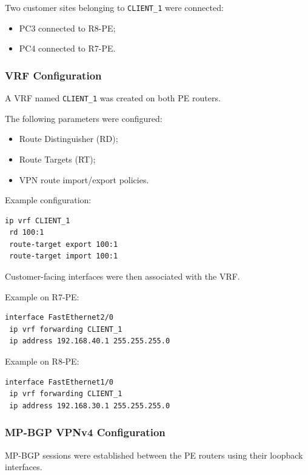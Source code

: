 \documentclass[12pt]{article}
\begin{document}
Two customer sites belonging to \texttt{CLIENT\_1} were connected:
\begin{itemize}
    \item PC3 connected to R8-PE;
    \item PC4 connected to R7-PE.
\end{itemize}

\subsubsection{VRF Configuration}

A VRF named \texttt{CLIENT\_1} was created on both PE routers.

The following parameters were configured:
\begin{itemize}
    \item Route Distinguisher (RD);
    \item Route Targets (RT);
    \item VPN route import/export policies.
\end{itemize}

Example configuration:

\begin{lstlisting}
ip vrf CLIENT_1
 rd 100:1
 route-target export 100:1
 route-target import 100:1
\end{lstlisting}

Customer-facing interfaces were then associated with the VRF.

Example on R7-PE:

\begin{lstlisting}
interface FastEthernet2/0
 ip vrf forwarding CLIENT_1
 ip address 192.168.40.1 255.255.255.0
\end{lstlisting}

Example on R8-PE:

\begin{lstlisting}
interface FastEthernet1/0
 ip vrf forwarding CLIENT_1
 ip address 192.168.30.1 255.255.255.0
\end{lstlisting}

\subsubsection{MP-BGP VPNv4 Configuration}

MP-BGP sessions were established between the PE routers using their loopback interfaces.
\end{document}
